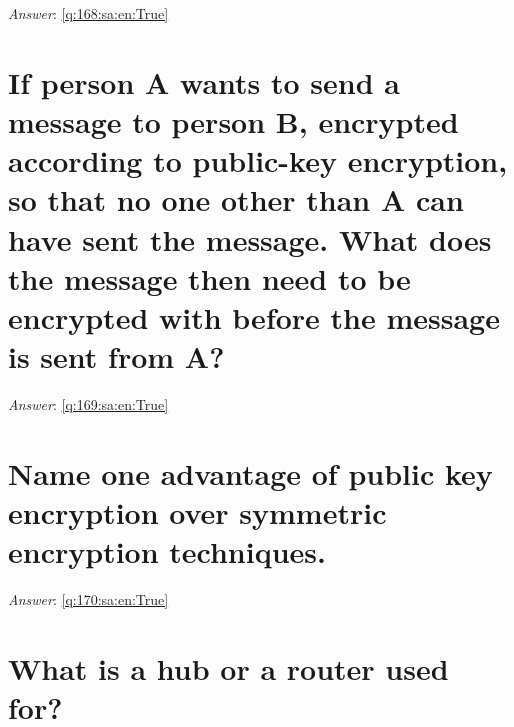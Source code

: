\documentclass[a4paper,11pt,oneside]{book}
\begin{document}
\begin{sloppypar}
\label{q:168:sa:en:False}

\vspace{2cm}

\noindent\makebox[\textwidth]{\hrulefill}

\vspace{1cm}

\textit{Answer}: \autoref{q:168:sa:en:True}



\section{If person A wants to send a message to person B, encrypted according to public-key encryption, so that no one other than A can have sent the message. What does the message then need to be encrypted with before the message is sent from A?}

\label{q:169:sa:en:False}

\vspace{2cm}

\noindent\makebox[\textwidth]{\hrulefill}

\vspace{1cm}

\textit{Answer}: \autoref{q:169:sa:en:True}



\section{Name one advantage of public key encryption over symmetric encryption techniques.}

\label{q:170:sa:en:False}

\vspace{2cm}

\noindent\makebox[\textwidth]{\hrulefill}

\vspace{1cm}

\textit{Answer}: \autoref{q:170:sa:en:True}



\section{What is a hub or a router used for?}

\label{q:171:sa:en:False}

\vspace{2cm}

\noindent\makebox[\textwidth]{\hrulefill}


\end{sloppypar}
\end{document}
